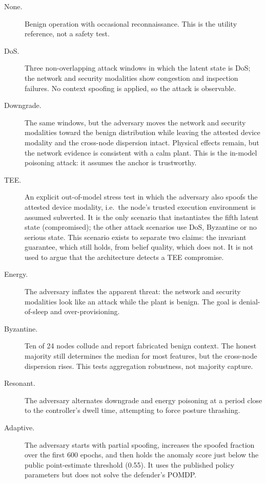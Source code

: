 \begin{description}
  \item[None.] Benign operation with occasional reconnaissance. This is the
  utility reference, not a safety test.
  \item[DoS.] Three non-overlapping attack windows in which the latent state is
  DoS; the network and security modalities show congestion and inspection
  failures. No context spoofing is applied, so the attack is observable.
  \item[Downgrade.] The same windows, but the adversary moves the network and
  security modalities toward the benign distribution while leaving the attested
  device modality and the cross-node dispersion intact. Physical effects remain,
  but the network evidence is consistent with a calm plant. This is the in-model
  poisoning attack: it assumes the anchor is trustworthy.
  \item[TEE.] An explicit out-of-model stress test in which the adversary also
  spoofs the attested device modality, i.e.\ the node's trusted execution
  environment is assumed subverted. It is the only scenario that instantiates
  the fifth latent state (compromised); the other attack scenarios use DoS,
  Byzantine or no serious state. This scenario exists to separate two claims:
  the invariant guarantee, which still holds, from belief quality, which does
  not. It is not used to argue that the architecture detects a TEE compromise.
  \item[Energy.] The adversary inflates the apparent threat: the network and
  security modalities look like an attack while the plant is benign. The goal is
  denial-of-sleep and over-provisioning.
  \item[Byzantine.] Ten of 24 nodes collude and report fabricated benign context.
  The honest majority still determines the median for most features, but the
  cross-node dispersion rises. This tests aggregation robustness, not majority
  capture.
  \item[Resonant.] The adversary alternates downgrade and energy poisoning at a
  period close to the controller's dwell time, attempting to force posture
  thrashing.
  \item[Adaptive.] The adversary starts with partial spoofing, increases the
  spoofed fraction over the first 600 epochs, and then holds the anomaly score
  just below the public point-estimate threshold (0.55). It uses the published
  policy parameters but does not solve the defender's POMDP.
\end{description}

